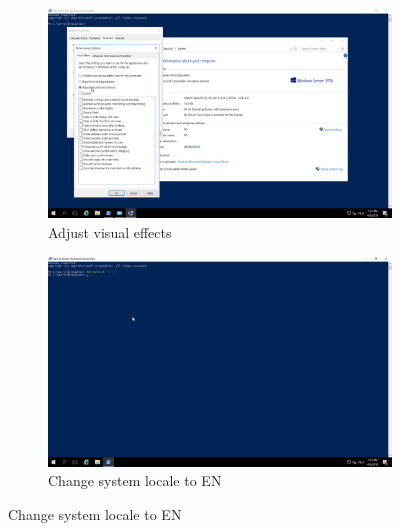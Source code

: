 \begin{figure}[!htb]\ContinuedFloat
    \begin{subfigure}{0.5\textwidth}
        \captionsetup{width=0.8\linewidth}
        \includegraphics[width=0.9\linewidth]{img/Methodologie/Precondition2.png}
        \centering
        \caption{Adjust visual effects}
    \end{subfigure}
    \begin{subfigure}{0.5\textwidth}
        \captionsetup{width=0.8\linewidth}
        \includegraphics[width=0.9\linewidth]{img/Methodologie/Precondition3.png} 
        \centering
        \caption{Change system locale to EN}
    \end{subfigure}
\end{figure}
